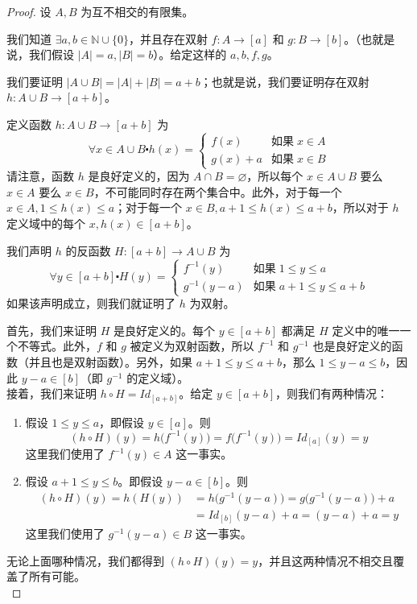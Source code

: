 \begin{proof}
    设 $A,B$ 为互不相交的有限集。

    我们知道 $\exists a, b \in \mathbb{N} \cup \{0\}$，并且存在双射 $f : A \to [a]$ 和 $g : B \to [b]$。（也就是说，我们假设 $|A| = a, |B| = b$）。给定这样的 $a, b, f, g$。

    我们要证明 $|A \cup B| = |A| + |B| = a + b$；也就是说，我们要证明存在双射 $h : A \cup B \to [a + b]$。

    定义函数 $h : A \cup B \to [a + b]$ 为
    \[\forall x \in A \cup B \centerdot h(x) = \begin{cases}
        f(x) & \text{如果}\; x \in A \\
        g(x)+a & \text{如果}\; x \in B
    \end{cases}\]
    请注意，函数 $h$ 是良好定义的，因为 $A \cap B = \varnothing$，所以每个 $x \in A \cup B$ 要么 $x \in A$ 要么 $x \in B$，不可能同时存在两个集合中。此外，对于每一个 $x \in A, 1 \le h(x) \le a$；对于每一个 $x \in B, a+1 \le h(x) \le a+b$，所以对于 $h$ 定义域中的每个 $x, h(x) \in [a+b]$。

    我们声明 $h$ 的反函数 $H : [a + b] \to A \cup B$ 为
    \[\forall y \in [a + b] \centerdot H(y) = \begin{cases}
        f^{-1}(y) & \text{如果}\; 1 \le y \le a \\
        g^{-1}(y-a) & \text{如果}\; a+1 \le y \le a+b
    \end{cases}\]
    如果该声明成立，则我们就证明了 $h$ 为双射。

    首先，我们来证明 $H$ 是良好定义的。每个 $y \in [a + b]$ 都满足 $H$ 定义中的唯一一个不等式。此外，$f$ 和 $g$ 被定义为双射函数，所以 $f^{-1}$ 和 $g^{-1}$ 也是良好定义的函数（并且也是双射函数）。另外，如果 $a + 1 \le y \le a + b$，那么 $1 \le y - a \le b$，因此 $y - a \in [b]$（即 $g^{-1}$ 的定义域）。\\

    接着，我们来证明 $h \circ H = Id_{[a+b]}$。给定 $y \in [a+b]$，则我们有两种情况：
    \begin{enumerate}[label=(\arabic*)]
        \item 假设 $1 \le y \le a$，即假设 $y \in [a]$。则
            \[(h \circ H)(y) = h\big(f^{-1}(y)\big) = f\big(f^{-1}(y)\big)= Id_{[a]}(y) = y\]
            这里我们使用了 $f^{-1}(y) \in A$ 这一事实。
        \item 假设 $a + 1 \le y \le b$。即假设 $y-a \in [b]$。则
            \begin{align*}
                (h \circ H)(y) = h(H(y)) &= h\big(g^{-1}(y-a)\big) = g\big(g^{-1}(y-a)\big)+a \\
                &= Id_{[b]}(y - a) + a = (y - a) + a = y
            \end{align*}
            这里我们使用了 $g^{-1}(y - a) \in B$ 这一事实。
    \end{enumerate}
    无论上面哪种情况，我们都得到 $(h \circ H)(y) = y$，并且这两种情况不相交且覆盖了所有可能。\\


\end{proof}
